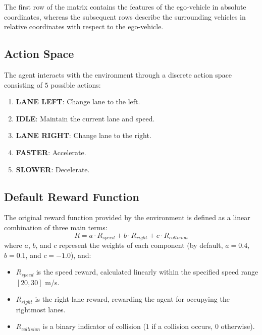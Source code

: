 \documentclass{article}
\begin{document}
The first row of the matrix contains the features of the ego-vehicle in absolute coordinates, whereas the subsequent rows describe the surrounding vehicles in relative coordinates with respect to the ego-vehicle.

\subsection{Action Space}
The agent interacts with the environment through a discrete action space consisting of $5$ possible actions:
\begin{enumerate}
    \setcounter{enumi}{0}
    \item \textbf{LANE LEFT}: Change lane to the left.
    \item \textbf{IDLE}: Maintain the current lane and speed.
    \item \textbf{LANE RIGHT}: Change lane to the right.
    \item \textbf{FASTER}: Accelerate.
    \item \textbf{SLOWER}: Decelerate.
\end{enumerate}

\subsection{Default Reward Function}
The original reward function provided by the environment is defined as a linear combination of three main terms:
\begin{equation}
    R = a \cdot R_{speed} + b \cdot R_{right} + c \cdot R_{collision}
\end{equation}
where $a$, $b$, and $c$ represent the weights of each component (by default, $a=0.4$, $b=0.1$, and $c=-1.0$), and:
\begin{itemize}
    \item $R_{speed}$ is the speed reward, calculated linearly within the specified speed range $[20, 30]$ m/s.
    \item $R_{right}$ is the right-lane reward, rewarding the agent for occupying the rightmost lanes.
    \item $R_{collision}$ is a binary indicator of collision ($1$ if a collision occurs, $0$ otherwise).
\end{itemize}
\end{document}
